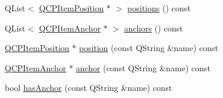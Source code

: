 \begin{DoxyCompactItemize}
Q\+List$<$ \hyperlink{class_q_c_p_item_position}{Q\+C\+P\+Item\+Position} $\ast$ $>$ \hyperlink{class_q_c_p_abstract_item_adf6a680cc29a6bce8345c3b6af3a91a1}{positions} () const 
\item 
Q\+List$<$ \hyperlink{class_q_c_p_item_anchor}{Q\+C\+P\+Item\+Anchor} $\ast$ $>$ \hyperlink{class_q_c_p_abstract_item_a8454b9941960b840608a5a1e00b1977d}{anchors} () const 
\item 
\hyperlink{class_q_c_p_item_position}{Q\+C\+P\+Item\+Position} $\ast$ \hyperlink{class_q_c_p_abstract_item_af71345bd150f87fa1d2442837b87bb59}{position} (const Q\+String \&name) const 
\item 
\hyperlink{class_q_c_p_item_anchor}{Q\+C\+P\+Item\+Anchor} $\ast$ \hyperlink{class_q_c_p_abstract_item_abed974cba7cc02608c71dad4638e008d}{anchor} (const Q\+String \&name) const 
\item 
bool \hyperlink{class_q_c_p_abstract_item_acbce9e5ba5252541d19db0c40303357a}{has\+Anchor} (const Q\+String \&name) const 
\end{DoxyCompactItemize}
